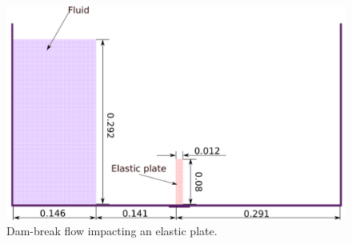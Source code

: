 \documentclass[10pt, conference]{FMFP2022}
\begin{document}
\begin{figure}[H]
  \centering
  \includegraphics[scale=0.4]{images/sun_2019_dam_breaking_flow_impacting_an_elastic_plate/schematic}
  \caption{Dam-break flow impacting an elastic plate.}
\label{fig:dam-break-flow-impact-plate-initial-setup}
\end{figure}
\end{document}

